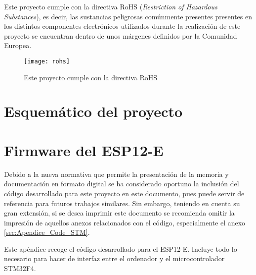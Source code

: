 Este proyecto cumple con la directiva RoHS (\textit{Restriction of Hazardous Substances}), es decir, las sustancias peligrosas comúnmente presentes presentes en los distintos componentes electrónicos utilizados durante la realización de este proyecto se encuentran dentro de unos márgenes definidos por la Comunidad Europea.

\begin{figure} [h]
    \centering
    \texttt{[image: rohs]}
    \caption{Este proyecto cumple con la directiva RoHS \cite{rohs}}
    \label{fig:rohs}
\end{figure}

\chapter{Esquemático del proyecto\label{sec:Schematic}}

\chapter{Firmware del ESP12-E\label{sec:Apendice_Code_ESP}}

Debido a la nueva normativa que permite la presentación de la memoria y documentación en formato digital se ha considerado oportuno la inclusión del código desarrollado para este proyecto en este documento, pues puede servir de referencia para futuros trabajos similares. Sin embargo, teniendo en cuenta su gran extensión, si se desea imprimir este documento se recomienda omitir la impresión de aquellos anexos relacionados con el código, especialmente el anexo \ref{sec:Apendice_Code_STM}.

Este apéndice recoge el código desarrollado para el ESP12-E. Incluye todo lo necesario para hacer de interfaz entre el ordenador y el microcontrolador STM32F4.


